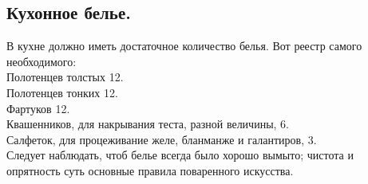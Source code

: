 \subsection{Кухонное белье.}
В кухне должно иметь достаточное количество белья. Вот реестр самого необходимого:\\
Полотенцев толстых 12.\\
Полотенцев тонких 12.\\
Фартуков 12.\\
Квашенников, для накрывания теста, разной величины, 6.\\
Салфеток, для процеживание желе, бланманже и галантиров, 3.\\
Следует наблюдать, чтоб белье всегда было хорошо вымыто; чистота и опрятность суть основные правила поваренного искусства.
